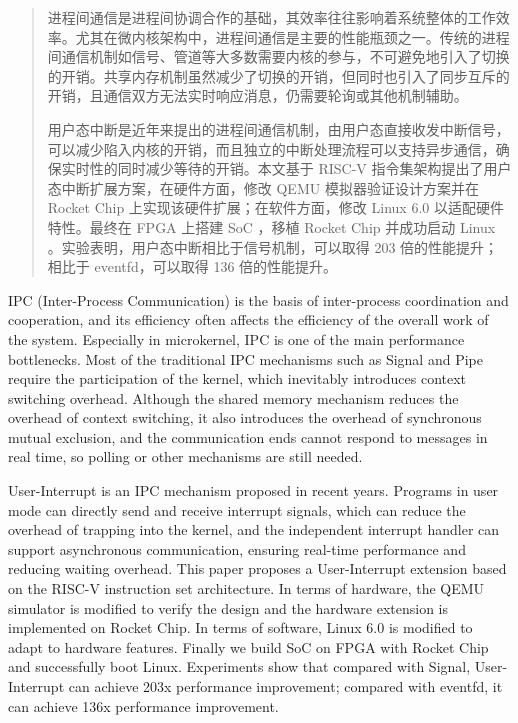 
\begin{abstract}
  
  进程间通信是进程间协调合作的基础，其效率往往影响着系统整体的工作效率。尤其在微内核架构中，进程间通信是主要的性能瓶颈之一。传统的进程间通信机制如信号、管道等大多数需要内核的参与，不可避免地引入了切换的开销。共享内存机制虽然减少了切换的开销，但同时也引入了同步互斥的开销，且通信双方无法实时响应消息，仍需要轮询或其他机制辅助。
  
  用户态中断是近年来提出的进程间通信机制，由用户态直接收发中断信号，可以减少陷入内核的开销，而且独立的中断处理流程可以支持异步通信，确保实时性的同时减少等待的开销。本文基于 RISC-V 指令集架构提出了用户态中断扩展方案，在硬件方面，修改 QEMU 模拟器验证设计方案并在 Rocket Chip 上实现该硬件扩展；在软件方面，修改 Linux 6.0 以适配硬件特性。最终在 FPGA 上搭建 SoC ，移植 Rocket Chip 并成功启动 Linux 。实验表明，用户态中断相比于信号机制，可以取得 203 倍的性能提升；相比于 eventfd，可以取得 136 倍的性能提升。

\end{abstract}

\begin{abstract*}

  IPC (Inter-Process Communication) is the basis of inter-process coordination and cooperation, and its efficiency often affects the efficiency of the overall work of the system. Especially in microkernel, IPC is one of the main performance bottlenecks. Most of the traditional IPC mechanisms such as Signal and Pipe require the participation of the kernel, which inevitably introduces context switching overhead. Although the shared memory mechanism reduces the overhead of context switching, it also introduces the overhead of synchronous mutual exclusion, and the communication ends cannot respond to messages in real time, so polling or other mechanisms are still needed.
  
  User-Interrupt is an IPC mechanism proposed in recent years. Programs in user mode can directly send and receive interrupt signals, which can reduce the overhead of trapping into the kernel, and the independent interrupt handler can support asynchronous communication, ensuring real-time performance and reducing waiting overhead. This paper proposes a User-Interrupt extension based on the RISC-V instruction set architecture. In terms of hardware, the QEMU simulator is modified to verify the design and the hardware extension is implemented on Rocket Chip. In terms of software, Linux 6.0 is modified to adapt to hardware features. Finally we build SoC on FPGA with Rocket Chip and successfully boot Linux. Experiments show that compared with Signal, User-Interrupt can achieve 203x performance improvement; compared with eventfd, it can achieve 136x performance improvement.

\end{abstract*}
